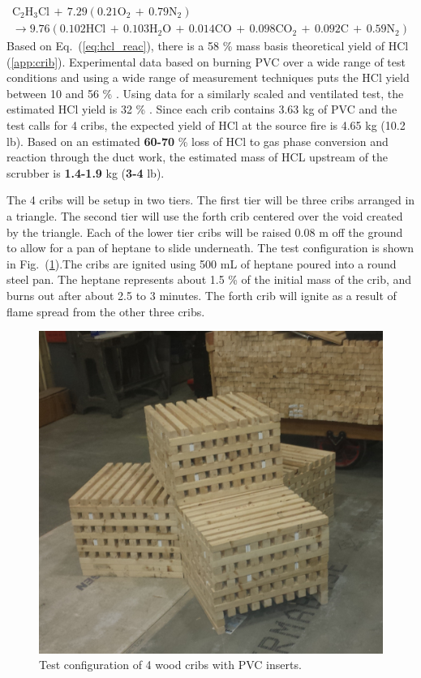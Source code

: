 \documentclass[12pt,oneside]{book}
\renewcommand{\C}{\mbox{C}}
\renewcommand{\H}{\mbox{H}}
\renewcommand{\O}{\mbox{O}}
\newcommand{\N}{\mbox{N}}
\newcommand{\Cl}{\mbox{Cl}}
\newcommand{\HCl}{\mbox{HCl}}
\begin{document}
\begin{multline}
\C_2\H_3\Cl \,+\, 7.29(0.21 \O_2 \,+\, 0.79 \N_2) \\
\rightarrow 9.76(0.102\HCl \,+\, 0.103\H_2\O \,+\, 0.014 \C\O \,+\, 0.098 \C\O_2 \,+\, 0.092 \C \,+\, 0.59 \N_2)
\label{eq:hcl_reac}
\end{multline}
Based on Eq.~(\ref{eq:hcl_reac}), there is a 58 \% mass basis theoretical yield of HCl (\ref{app:crib}).  Experimental data based on burning PVC over a wide range of test conditions and using a wide range of measurement techniques puts the HCl yield between 10 and 56 \% \cite{Leeds:PVC}. Using data for a similarly scaled and ventilated test, the estimated HCl yield is 32 \% \cite{Persson1998}. Since each crib contains 3.63 kg of PVC and the test calls for 4 cribs, the expected yield of HCl at the source fire is 4.65 kg (10.2 lb). Based on an estimated {\bf 60-70} \% loss of HCl to gas phase conversion and reaction through the duct work, the estimated mass of HCL upstream of the scrubber is {\bf 1.4-1.9} kg ({\bf 3-4} lb).

The 4 cribs will be setup in two tiers. The first tier will be three cribs arranged in a triangle. The second tier will use the forth crib centered over the void created by the triangle. Each of the lower tier cribs will be raised 0.08 m off the ground to allow for a pan of heptane to slide underneath. The test configuration is shown in Fig.~(\ref{fig:test_crib}).The cribs are ignited using 500 mL of heptane poured into a round steel pan. The heptane represents about 1.5 \% of the initial mass of the crib, and burns out after about 2.5 to 3 minutes. The forth crib will ignite as a result of flame spread from the other three cribs.

\begin{figure}
\centering
\includegraphics[width=.7\textwidth]{../Figures/cribs}
\caption {Test configuration of 4 wood cribs with PVC inserts.}
\label{fig:test_crib}
\end{figure}
\end{document}
